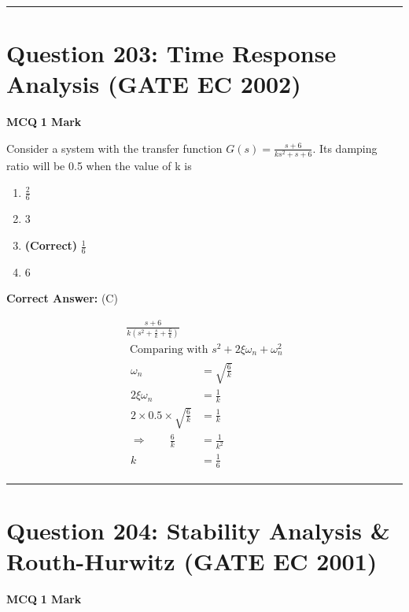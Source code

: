 \documentclass[11pt,a4paper]{article}
\begin{document}
\vspace{1.5em}
\hrule
\vspace{1.5em}

\section*{Question 203: Time Response Analysis (GATE EC 2002)}
\noindent \textbf{\color{primary}MCQ} \hfill \textbf{\color{secondary}1 Mark}


\noindent Consider a system with the transfer function $G(s)=\frac{s+6}{ks^{2}+s+6}$. Its damping ratio will be 0.5 when the value of k is


\begin{enumerate}[label=(\Alph*)]
    \item $\frac{2}{6}$
    \item 3
    \item \textbf{(Correct)} $\frac{1}{6}$
    \item 6
\end{enumerate}

\noindent \textbf{Correct Answer:} (C)

\begin{tcolorbox}[solbox, title=Detailed Solution -- Question 203]
\[
\begin{array}{l} \frac{s+6}{k\left(s^{2}+\frac{s}{k}+\frac{6}{k}\right)} \\ \text { Comparing with } s^{2}+2 \xi \omega_{n}+\omega_{n}^{2} \\ \begin{aligned} \omega_{n}&=\sqrt{\frac{6}{k}} \\ 2 \xi \omega_{n}&=\frac{1}{k} \\ 2 \times 0.5 \times \sqrt{\frac{6}{k}}&=\frac{1}{k} \\ \Rightarrow \qquad \frac{6}{k}&=\frac{1}{k^{2}} \\ k&=\frac{1}{6} \end{aligned} \end{array}
\]
\end{tcolorbox}

\vspace{1.5em}
\hrule
\vspace{1.5em}

\section*{Question 204: Stability Analysis \& Routh-Hurwitz (GATE EC 2001)}
\noindent \textbf{\color{primary}MCQ} \hfill \textbf{\color{secondary}1 Mark}
\end{document}
